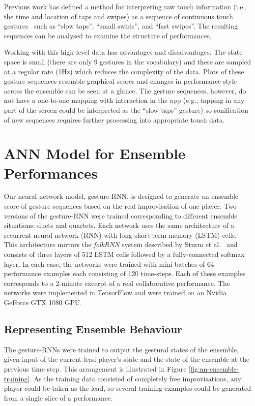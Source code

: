 \documentclass[sigchi]{acmart} %
\begin{document}
Previous work has defined a method for interpreting raw touch
information (i.e., the time and location of taps and swipes) as a
sequence of continuous touch gestures~\cite{Martin:2015jk} such as
``slow taps'', ``small swirls'', and ``fast swipes''. The resulting
sequences can be analysed to examine the structure of performances.

Working with this high-level data has advantages and disadvantages.
The state space is small (there are only 9 gestures in the vocabulary)
and these are sampled at a regular rate (1Hz) which reduces the
complexity of the data. Plots of these gesture sequences resemble
graphical scores and changes in performance style across the ensemble
can be seen at a glance. The gesture sequences, however, do not have a
one-to-one mapping with interaction in the app (e.g., tapping in any
part of the screen could be interpreted as the ``slow taps'' gesture)
so sonification of new sequences requires further processing into
appropriate touch data.

\section{ANN Model for Ensemble Performances}

Our neural network model, gesture-RNN, is designed to generate an
ensemble score of gesture sequences based on the real improvisation of
one player. Two versions of the gesture-RNN were trained corresponding
to different ensemble situations: duets and quartets. Each network
uses the same architecture of a recurrent neural network (RNN) with
long short-term memory (LSTM) cells. This architecture mirrors the
\emph{folkRNN} system described by Sturm et al.~\cite{Sturm:2016rz}
and consists of three layers of 512 LSTM cells followed by a
fully-connected softmax layer. In each case, the networks were trained
with mini-batches of 64 performance examples each consisting of 120
time-steps. Each of these examples corresponds to a 2-minute excerpt
of a real collaborative performance. The networks were implemented in
TensorFlow and were trained on an Nvidia GeForce
GTX 1080 GPU.

\subsection{Representing Ensemble Behaviour}

The gesture-RNNs were trained to output the gestural states of the
ensemble, given input of the current lead player's state and the state
of the ensemble at the previous time step. This arrangement is
illustrated in Figure \ref{fig:nn-ensemble-training}. As the training
data consisted of completely free improvisations, any player could be
taken as the lead, so several training examples could be generated from
a single slice of a performance.
\end{document}

